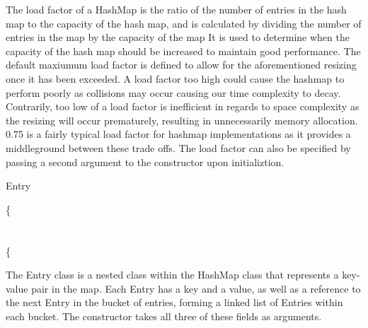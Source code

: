 \documentclass[a4paper]{article}
\begin{document}
The load factor of a HashMap is the ratio of the number of entries in the hash map to the capacity of the hash map,
and is calculated by dividing the number of entries in the map by the capacity of the map
It is used to determine when the capacity of the hash map should be increased to maintain good performance.
The default maxiumum load factor is defined to allow for the aforementioned resizing once it has been exceeded.
A load factor too high could cause the hashmap to perform poorly as collisions may occur causing our time complexity to decay. 
Contrarily, too low of a load factor is inefficient in regards to space complexity as the resizing will occur prematurely,
resulting in unnecessarily memory allocation. \\

0.75 is a fairly typical load factor for hashmap implementations as it provides a middleground between
these trade offs. The load factor can also be specified by passing a second argument to the constructor upon initializtion. \pagebreak




\makeatletter
\renewcommand{\ALG@name}{Nested Class}
\makeatother
\setcounter{algorithm}{0}

\begin{algorithm}
\caption{Entry}\label{euclid}
\begin{algorithmic}[1]



\algrenewcommand{}
 {\{} \\
 \\

\State{}
\State{}
\State{}
\State{\{} \\
\{
\EndProcedure
\end{algorithmic}
\end{algorithm}




The Entry class is a nested class within the HashMap class that represents a key-value pair in the map.
Each Entry has a key and a value, as well as a reference to the next Entry in the bucket of entries,
forming a linked list of Entries within each bucket.
The constructor takes all three of these fields as arguments. \\
\end{document}
